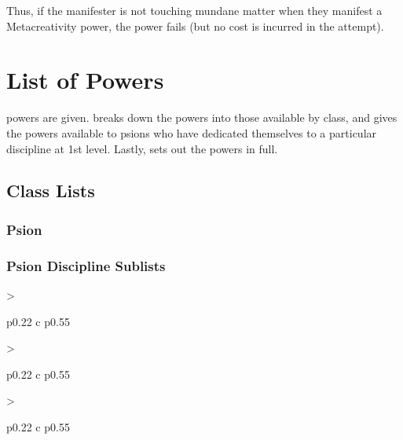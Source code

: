 Thus,
if the manifester is not touching mundane matter
when they manifest a Metacreativity power,
the power fails (but no cost is incurred in the attempt).

\chapter{List of Powers}
\label{chap:list_of_powers}
powers are given.
 breaks down the powers into those
available by class,
and  gives the powers
available to psions who have dedicated themselves to a
particular discipline at 1st level.
Lastly,
 sets out the powers in full.

\section{Class Lists}
\label{sec:class_lists}
\DndSetThemeColor[DmgLavender]
\subsection{Psion}
\begin{dndlongtable}[
    >{\raggedright\arraybackslash}p{0.22\linewidth} c p{0.55\linewidth}]
    
\end{dndlongtable}

\subsection{Psion Discipline Sublists}
\label{sub:discipline_sublists}
\DndSetThemeColor[PhbLightCyan]
\begin{DndTable}[header=Prescience Sublist, bold=false]{
    >{\raggedright\arraybackslash}p{0.22\linewidth} c p{0.55\linewidth}}
    
\end{DndTable}

\DndSetThemeColor[PhbMauve]
\begin{DndTable}[header=Prana Bindu Sublist, bold=false]{
    >{\raggedright\arraybackslash}p{0.22\linewidth} c p{0.55\linewidth}}
    
\end{DndTable}

\DndSetThemeColor[PhbTan]
\begin{DndTable}[header=Voice Sublist, bold=false]{
    >{\raggedright\arraybackslash}p{0.22\linewidth} c p{0.55\linewidth}}
    
\end{DndTable}


